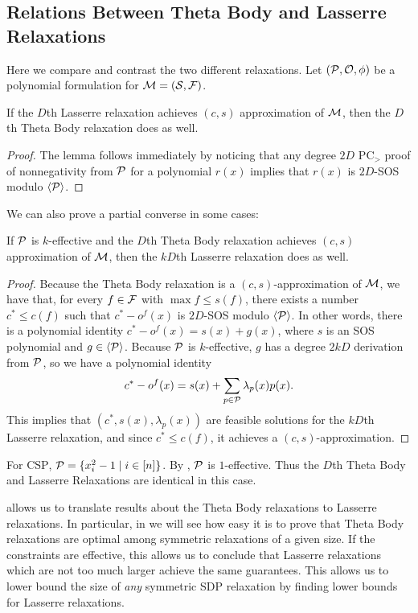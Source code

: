 \subsection{Relations Between Theta Body and Lasserre Relaxations}
Here we compare and contrast the two different relaxations. Let $(\mathcal P, \mathcal O, \phi)$ be a polynomial formulation for $\mathcal M = (\mathcal S, \mathcal F)$.
\begin{lemma}
If the $D$th Lasserre relaxation achieves $(c,s)$ approximation of $\mathcal M$, then the $D$th Theta Body relaxation does as well.
\end{lemma}
\begin{proof}
The lemma follows immediately by noticing that any degree $2D$ PC$_>$ proof of nonnegativity from $\mathcal P$ for a polynomial $r(x)$ implies that $r(x)$ is $2D$-SOS modulo $\langle \mathcal P \rangle$.
\end{proof}
We can also prove a partial converse in some cases:
\begin{proposition}\label{prop:tb_to_sos}
If $\mathcal P$ is $k$-effective and the $D$th Theta Body relaxation achieves $(c,s)$ approximation of $\mathcal M$, then the $kD$th Lasserre relaxation does as well.
\end{proposition}
\begin{proof}
Because the Theta Body relaxation is a $(c,s)$-approximation of $\mathcal M$, we have that, for every $f \in \mathcal F$ with $\max f \leq s(f)$, there exists a number $c^* \leq c(f)$ such that $c^* - o^f(x)$ is $2D$-SOS modulo $\langle \mathcal P \rangle$. In other words, there is a polynomial identity $c^* - o^f(x) = s(x) + g(x)$, where $s$ is an SOS polynomial and $g \in \langle \mathcal P \rangle$. Because $\mathcal P$ is $k$-effective, $g$ has a degree $2kD$ derivation from $\mathcal P$, so we have a polynomial identity
\[c^* - o^f(x) = s(x) + \sum_{p \in \mathcal P} \lambda_p(x)p(x).\]
This implies that $(c^*, s(x), \lambda_p(x))$ are feasible solutions for the $kD$th Lasserre relaxation, and since $c^* \leq c(f)$, it achieves a $(c,s)$-approximation.
\end{proof}
\begin{example}
For \textsc{CSP}, $\mathcal P = \{x_i^2 - 1 \mid i \in [n]\}$. By , $\mathcal P$ is $1$-effective. Thus the $D$th Theta Body and Lasserre Relaxations are identical in this case.
\end{example}
 allows us to translate results about the Theta Body relaxations to Lasserre relaxations. In particular, in  we will see how easy it is to prove that Theta Body relaxations are optimal among symmetric relaxations of a given size. If the constraints are effective, this allows us to conclude that Lasserre relaxations which are not too much larger achieve the same guarantees. This allows us to lower bound the size of \emph{any} symmetric SDP relaxation by finding lower bounds for Lasserre relaxations.

